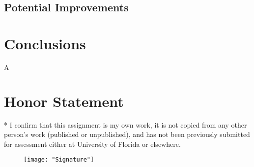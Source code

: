 \documentclass[conference]{IEEEtran}
\begin{document}
\subsection{Potential Improvements}



\section{Conclusions} \label{Conclusions}
A

\section*{Honor Statement}
\noindent
* I confirm that this assignment is my own work, it is not copied from any other person's work (published or unpublished), and has not been previously submitted for assessment either at University of Florida or elsewhere.

\begin{figure}[h!]
	\centering
	\texttt{[image: "Signature"]}
\end{figure}
\end{document}
